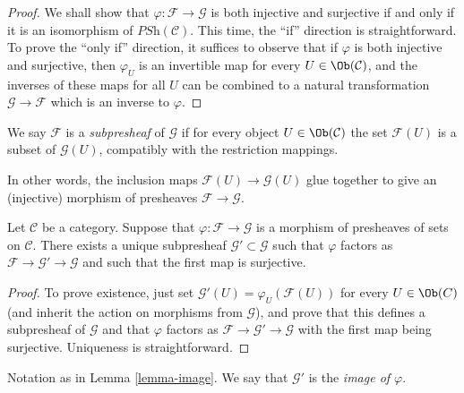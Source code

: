 \begin{proof}
\medskip\noindent
We shall show that $\varphi : \mathcal{F} \to
\mathcal{G}$ is both injective and surjective if and only if it
is an isomorphism of $\textit{PSh}(\mathcal{C})$. This time,
the ``if'' direction is straightforward. To prove the ``only if''
direction, it suffices to observe that if $\varphi$ is both
injective and surjective, then $\varphi_U$ is an invertible map
for every $U \in \Ob(\mathcal{C})$, and the inverses of these
maps for all $U$ can be combined to a natural transformation
$\mathcal{G} \to \mathcal{F}$ which is an inverse to $\varphi$.
\end{proof}

\begin{definition}
\label{definition-sub-presheaf}
We say $\mathcal{F}$ is a {\it subpresheaf} of $\mathcal{G}$
if for every object $U \in \Ob(\mathcal{C})$ the set
$\mathcal{F}(U)$ is a subset of $\mathcal{G}(U)$, compatibly
with the restriction mappings.
\end{definition}

\noindent
In other words, the inclusion
maps $\mathcal{F}(U) \to \mathcal{G}(U)$
glue together to give an (injective) morphism of
presheaves $\mathcal{F} \to \mathcal{G}$.

\begin{lemma}
\label{lemma-image}
Let $\mathcal{C}$ be a category.
Suppose that $\varphi : \mathcal{F} \to \mathcal{G}$ is a
morphism of presheaves of sets on $\mathcal{C}$.
There exists a unique subpresheaf $\mathcal{G}' \subset \mathcal{G}$
such that $\varphi$ factors as
$\mathcal{F} \to \mathcal{G}' \to \mathcal{G}$
and such that the first map is surjective.
\end{lemma}

\begin{proof}
To prove existence, just set
$\mathcal{G}'(U) = \varphi_U \left(\mathcal{F}(U)\right)$
for every $U \in \Ob(C)$ (and inherit the action on morphisms
from $\mathcal{G}$), and prove that this defines a
subpresheaf of $\mathcal{G}$ and that $\varphi$ factors as
$\mathcal{F} \to \mathcal{G}' \to \mathcal{G}$ with the
first map being surjective. Uniqueness is straightforward.
\end{proof}

\begin{definition}
\label{definition-image}
Notation as in Lemma \ref{lemma-image}. We
say that $\mathcal{G}'$ is the {\it image of $\varphi$}.
\end{definition}

















